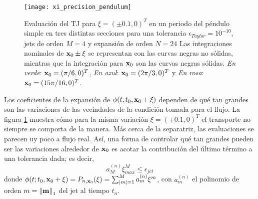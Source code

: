 \begin{figure}[h!]
	\centering
	\texttt{[image: xi\_precision\_pendulum]}
	\caption{Evaluación del TJ para $\xi = ( \pm 0.1, 0)^T$ en un periodo del péndulo simple en tres distintas secciones para una tolerancia $\epsilon_{Taylor} = 10^{-10}$, jets de orden $M=4$ y expansión de orden $N=24$ Las integraciones nominales de $\mathbf{x}_0 \pm \xi$ se representan con las curvas negras no sólidas, mientras que la integración para $\mathbf{x}_0$ son las curvas negras sólidas. \textit{En verde}: $\mathbf{x}_0 = (\pi/6, 0)^T$, \textit{En azul}: $\mathbf{x}_0 = (2\pi/3, 0)^T$ y \textit{En rosa}: $\mathbf{x}_0 = (15\pi/16, 0)^T$.}
	\label{fig:xi_precision_pendulum}
\end{figure}


Los coeficientes de la expansión de $\phi(t;t_0,\mathbf{x}_0 + \xi)$ dependen de qué tan grandes son las variaciones de las vecindades de la condición tomada para el flujo. La figura \ref{fig:xi_precision_pendulum} muestra cómo para la misma variación $\xi = (\pm 0.1, 0)^T$ el transporte no siempre se comporta de la manera. Más cerca de la separatriz, las evaluaciones se parecen uy poco a flujo real. Así, una forma de controlar qué tan grandes pueden ser las variaciones alrededor de $\mathbf{x}_0$ es acotar la contribución del último término a una tolerancia dada; es decir,
\begin{equation*}
 a_{M}^{(n)}\xi_{max}^M \leq \epsilon_{jet}
\end{equation*}
donde $\phi(t;t_0,\mathbf{x}_0 + \xi) = P_{n,\mathbf{x}_0}(\xi) = \sum_{|m|=1}^M  a_{m}^{(n)} \xi^m$, con $a_{m}^{(n)}$ el polinomio de orden $m = \left\lVert\mathbf{m}\right\rVert_1$ del jet al tiempo $t_n$.

